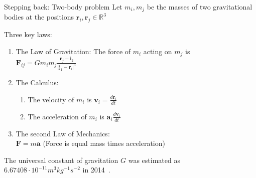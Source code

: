 \documentclass[12pt,t]{beamer}
\begin{document}
\begin{frame}{Stepping back: Two-body problem}
Let $m_i,m_j$ be the masses of two gravitational bodies at the positions $\mathbf{r}_i,\mathbf{r}_j\in\mathbb{R}^3$

\begin{block}{Three key laws:}
\begin{enumerate}
\item The Law of Gravitation: The force of $m_i$ acting on $m_j$ is \\
$\mathbf{F}_{ij}= G m_i m_j \frac{\mathbf{r}_j-\mathbf{i}_2}{\vert \mathbf{j}_1-\mathbf{r}_i \vert^3}$
\item The Calculus: 
\begin{enumerate}
\item The velocity of $m_i$ is $\mathbf{v}_i = \frac{d \mathbf{r}_i}{dt}$
\item The acceleration of $m_i$ is $\mathbf{a}_i \frac{d \mathbf{v}_i}{dt}$
\end{enumerate}
\item The second Law of Mechanics: \\
 $\mathbf{F}= m \mathbf{a}$ (Force is equal mass times acceleration)
\end{enumerate}
\end{block}
The universal constant of gravitation $G$ was estimated as $6.67408\cdot 10^{-11}m^3kg^{-1}s^{-2}$ in 2014~\cite{mohr2016codata}.
\end{frame}
\end{document}
